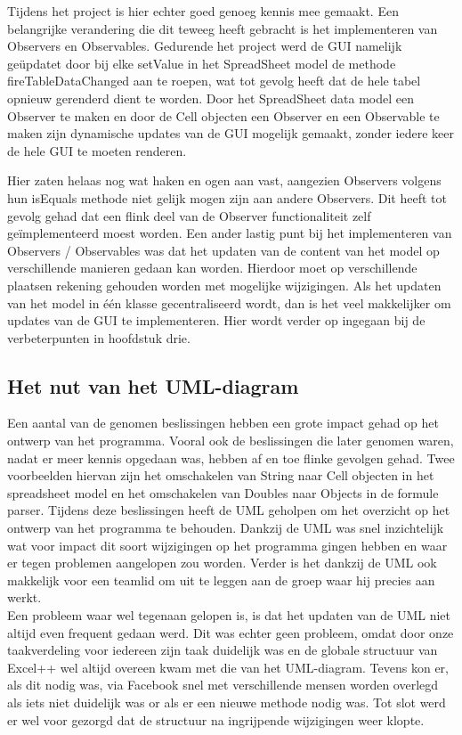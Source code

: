 \documentclass[a4paper,11pt,titlepage]{scrartcl}
\begin{document}
Tijdens het project is hier echter goed genoeg kennis mee gemaakt. Een belangrijke verandering die dit teweeg heeft gebracht is het implementeren van Observers en Observables. Gedurende het project werd de GUI namelijk geüpdatet door bij elke setValue in het SpreadSheet model de methode fireTableDataChanged aan te roepen, wat tot gevolg heeft dat de hele tabel opnieuw gerenderd dient te worden. Door het SpreadSheet data model een Observer te maken en door de Cell objecten een Observer en een Observable te maken zijn dynamische updates van de GUI mogelijk gemaakt, zonder iedere keer de hele GUI te moeten renderen.

\newpage Hier zaten helaas nog wat haken en ogen aan vast, aangezien Observers volgens hun isEquals methode niet gelijk mogen zijn aan andere Observers. Dit heeft tot gevolg gehad dat een flink deel van de Observer functionaliteit zelf geïmplementeerd moest worden. Een ander lastig punt bij het implementeren van Observers / Observables was dat het updaten van de content van het model op verschillende manieren gedaan kan worden. Hierdoor moet op verschillende plaatsen rekening gehouden worden met mogelijke wijzigingen. Als het updaten van het model in één klasse gecentraliseerd wordt, dan is het veel makkelijker om updates van de GUI te implementeren. Hier wordt verder op ingegaan bij de verbeterpunten in hoofdstuk drie.

\subsection{Het nut van het UML-diagram}
Een aantal van de genomen beslissingen hebben een grote impact gehad op het ontwerp van het programma. Vooral ook de beslissingen die later genomen waren, nadat er meer kennis opgedaan was, hebben af en toe flinke gevolgen gehad. Twee voorbeelden hiervan zijn het omschakelen van String naar Cell objecten in het spreadsheet model en het omschakelen van Doubles naar Objects in de formule parser. Tijdens deze beslissingen heeft de UML geholpen om het overzicht op het ontwerp van het programma te behouden. Dankzij de UML was snel inzichtelijk wat voor impact dit soort wijzigingen op het programma gingen hebben en waar er tegen problemen aangelopen zou worden. Verder is het dankzij de UML ook makkelijk voor een teamlid om uit te leggen aan de groep waar hij precies aan werkt.\\

Een probleem waar wel tegenaan gelopen is, is dat het updaten van de UML niet altijd even frequent gedaan werd. Dit was echter geen probleem, omdat door onze taakverdeling voor iedereen zijn taak duidelijk was en de globale structuur van Excel++ wel altijd overeen kwam met die van het UML-diagram. Tevens kon er, als dit nodig was, via Facebook snel met verschillende mensen worden overlegd als iets niet duidelijk was or als er een nieuwe methode nodig was. Tot slot werd er wel voor gezorgd dat de structuur na ingrijpende wijzigingen weer klopte.
\end{document}
